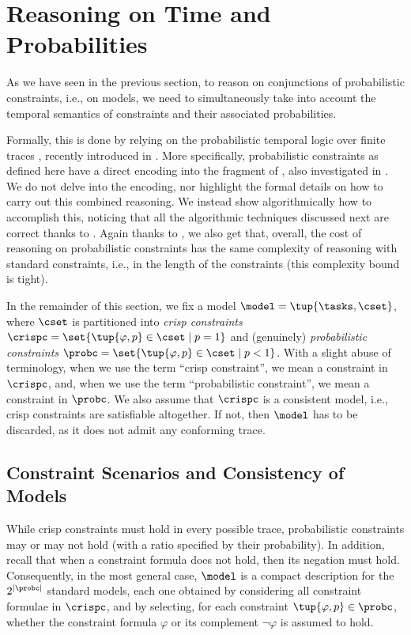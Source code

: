 
\section{Reasoning on Time and Probabilities}
As we have seen in the previous section, to reason on conjunctions of probabilistic constraints, i.e., on \pdeclare models, we need to simultaneously take into account the temporal semantics of constraints and their associated probabilities.

Formally, this is done by relying on the probabilistic temporal logic over finite traces \PLTL, recently introduced in \cite{MaMP20}. More specifically, probabilistic constraints as defined here have a direct encoding into the fragment \PLTLz of \PLTL, also investigated in \cite{MaMP20}. We do not delve into the encoding, nor highlight the formal details on how to carry out this combined reasoning. We instead show algorithmically how to accomplish this, noticing that all the algorithmic techniques discussed next are correct thanks to \cite{MaMP20}. Again thanks to \cite{MaMP20}, we also get that, overall, the cost of reasoning on probabilistic constraints has the same complexity of reasoning with standard \LTLf constraints, i.e., \PS in the length of the constraints (this complexity bound is tight).


In the remainder of this section, we fix a \pdeclare model $\model = \tup{\tasks,\cset}$, where $\cset$ is partitioned into \emph{crisp constraints} $\crispc = \set{\tup{\varphi,p} \in \cset \mid p = 1}$ and (genuinely) \emph{probabilistic constraints} $\probc = \set{\tup{\varphi,p} \in \cset \mid p < 1}$. With a slight abuse of terminology, when we use the term ``crisp constraint'', we mean a constraint in $\crispc$, and, when we use the term  ``probabilistic constraint'', we mean a constraint in $\probc$. We also assume that $\crispc$ is a consistent \declare model, i.e., crisp constraints are satisfiable altogether. If not, then $\model$ has to be discarded, as it does not admit any conforming trace.


\subsection{Constraint Scenarios and Consistency of \pdeclare Models}
While crisp constraints must hold in every possible trace, probabilistic constraints may or may not hold (with a ratio specified by their probability). In addition, recall that when a constraint formula does not hold, then its negation must hold. Consequently, in the most general case, $\model$ is a compact description for the $2^{|\probc|}$ standard \declare models, each one obtained by considering all constraint formulae in $\crispc$, and by selecting, for each constraint $\tup{\varphi,p} \in \probc$, whether the constraint formula $\varphi$ or its complement $\neg \varphi$ is assumed to hold.

